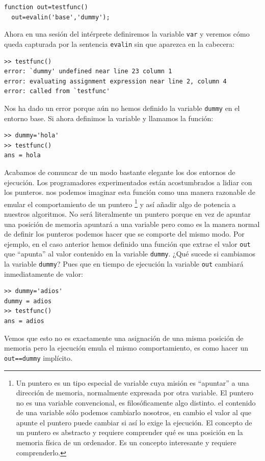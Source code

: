 \begin{verbatim}
function out=testfunc()
  out=evalin('base','dummy');
\end{verbatim}
Ahora en una sesión del intérprete definiremos la variable
\texttt{var} y veremos cómo queda capturada por la sentencia
\texttt{evalin} sin que aparezca en la cabecera:

\begin{verbatim}
>> testfunc()
error: `dummy' undefined near line 23 column 1
error: evaluating assignment expression near line 2, column 4
error: called from `testfunc'
\end{verbatim}
Nos ha dado un error porque aún no hemos definido la variable
\texttt{dummy} en el entorno base. Si ahora definimos la variable y
llamamos la función:

\begin{verbatim}
>> dummy='hola'
>> testfunc()
ans = hola
\end{verbatim}
Acabamos de comuncar de un modo bastante elegante los dos entornos de
ejecución. Los programadores experimentados están acostumbrados a
lidiar con los punteros. nos podemos imaginar esta función como una
manera razonable de emular el comportamiento de un puntero%
\footnote{Un puntero es un tipo especial de variable cuya misión es
  {}``apuntar'' a una dirección de memoria, normalmente expresada por
  otra variable.  El puntero no es una variable convencional, es
  filosóficamente algo distinto. el contenido de una variable sólo
  podemos cambiarlo nosotros, en cambio el valor al que apunte el
  puntero puede cambiar si así lo exige la ejecución. El concepto de
  un puntero es abstracto y requiere comprender qué es una posición en
  la memoria física de un ordenador.  Es un concepto interesante y
  requiere comprenderlo.%
} y así añadir algo de potencia a nuestros algoritmos. No será
literalmente un puntero porque en vez de apuntar una posición de
memoria apuntará a una variable pero como es la manera normal de
definir los punteros podemos hacer que se comporte del mismo modo. Por
ejemplo, en el caso anterior hemos definido una función que extrae el
valor \texttt{out} que {}``apunta'' al valor contenido en la variable
\texttt{dummy}.  ¿Qué sucede si cambiamos la variable \texttt{dummy}?
Pues que en tiempo de ejecución la variable \texttt{out} cambiará
inmediatamente de valor:

\begin{verbatim}
>> dummy='adios'
dummy = adios
>> testfunc()
ans = adios
\end{verbatim}
Vemos que esto no es exactamente una asignación de una misma posición
de memoria pero la ejecución emula el mismo comportamiento, es como
hacer un \texttt{out==dummy} implícito.

